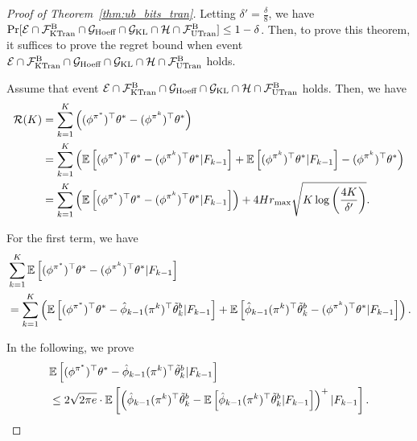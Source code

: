 \begin{proof}[Proof of Theorem~\ref{thm:ub_bits_tran}]
	Letting $\delta'=\frac{\delta}{8}$, we have $\Pr[\mathcal{E} \cap \mathcal{F}^{\textup{B}}_{\textup{KTran}} \cap \mathcal{G}_{\textup{Hoeff}} \cap \mathcal{G}_{\textup{KL}} \cap \mathcal{H} \cap \mathcal{F}^{\textup{B}}_{\textup{UTran}}] \leq 1-\delta$. Then, to prove this theorem, it suffices to prove
	the regret bound when event $\mathcal{E} \cap \mathcal{F}^{\textup{B}}_{\textup{KTran}} \cap \mathcal{G}_{\textup{Hoeff}} \cap \mathcal{G}_{\textup{KL}} \cap \mathcal{H} \cap \mathcal{F}^{\textup{B}}_{\textup{UTran}}$ holds.
	
	Assume that event $\mathcal{E} \cap \mathcal{F}^{\textup{B}}_{\textup{KTran}} \cap \mathcal{G}_{\textup{Hoeff}} \cap \mathcal{G}_{\textup{KL}} \cap \mathcal{H} \cap \mathcal{F}^{\textup{B}}_{\textup{UTran}}$ holds. Then, we have
	\begin{align}
		\mathcal{R}(K) &= \sum_{k=1}^{K} \left(  (\phi^{\pi^*})^\top \theta^* - (\phi^{\pi^k})^\top \theta^*  \right)
		\nonumber\\
		&= \sum_{k=1}^{K} \left(  \mathbb{E}\left[  (\phi^{\pi^*})^\top \theta^* - (\phi^{\pi^k})^\top \theta^* | F_{k-1}  \right] + \mathbb{E}\left[  (\phi^{\pi^k})^\top \theta^* | F_{k-1}  \right] - (\phi^{\pi^k})^\top \theta^*  \right) 
		\nonumber\\
		&= \sum_{k=1}^{K} \left(  \mathbb{E}\left[  (\phi^{\pi^*})^\top \theta^* - (\phi^{\pi^k})^\top \theta^* | F_{k-1}  \right]  \right) + 4 H r_{\max} \sqrt{ K \log\left( \frac{4K}{\delta'} \right) } . \label{eq:regret_decomposition}
	\end{align}
	
	
	For the first term, we have
	\begin{align}
		&\sum_{k=1}^{K} \mathbb{E}\left[  (\phi^{\pi^*})^\top \theta^* - (\phi^{\pi^k})^\top \theta^* | F_{k-1}  \right] 
		\nonumber\\
		&= \sum_{k=1}^{K} \left(  \mathbb{E}\left[  (\phi^{\pi^*})^\top \theta^* - \hat{\phi}_{k-1}(\pi^k)^\top \tilde{\theta}^{b}_k | F_{k-1}  \right] + \mathbb{E}\left[  \hat{\phi}_{k-1}(\pi^k)^\top \tilde{\theta}^{b}_k - (\phi^{\pi^k})^\top \theta^* | F_{k-1}  \right]  \right) . \label{eq:ex_phi_star-phi_pi_k_theta}
	\end{align}
	
	In the following, we prove
	\begin{align}
		&\mathbb{E}\left[  (\phi^{\pi^*})^\top \theta^* - \hat{\phi}_{k-1}(\pi^k)^\top \tilde{\theta}^{b}_k | F_{k-1}  \right] 
		\nonumber\\
		&\leq 2\sqrt{2\pi e} \cdot \mathbb{E}\left[  \left(  \hat{\phi}_{k-1}(\pi^k)^\top \tilde{\theta}^{b}_k  - \mathbb{E}\left[  \hat{\phi}_{k-1}(\pi^k)^\top \tilde{\theta}^{b}_k  | F_{k-1}  \right]  \right)^{+} | F_{k-1}  \right] . \label{eq:fist_term_leq_positive}
	\end{align}
	

\end{proof}
